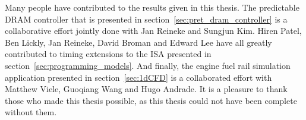 Many people have contributed to the results given in this thesis. 
The predictable DRAM controller that is presented in section~\ref{sec:pret_dram_controller} is a collaborative effort jointly done with Jan Reineke and Sungjun Kim. 
Hiren Patel, Ben Lickly, Jan Reineke, David Broman and Edward Lee have all greatly contributed to timing extensions to the ISA presented in section~\ref{sec:programming_models}.
And finally, the engine fuel rail simulation application presented in section~\ref{sec:1dCFD} is a collaborated effort with Matthew Viele, Guoqiang Wang and Hugo Andrade.
It is a pleasure to thank those who made this thesis possible, as this thesis could not have been complete without them. 
 







